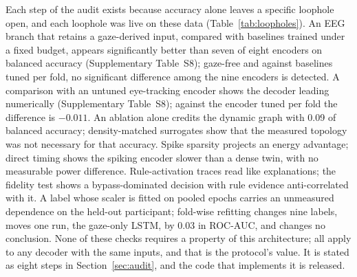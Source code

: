 Each step of the audit exists because accuracy alone leaves a specific loophole open, and each loophole was live on these data (Table~\ref{tab:loopholes}). An EEG branch that retains a gaze-derived input, compared with baselines trained under a fixed budget, appears significantly better than seven of eight encoders on balanced accuracy (Supplementary Table~S8); gaze-free and against baselines tuned per fold, no significant difference among the nine encoders is detected. A comparison with an untuned eye-tracking encoder shows the decoder leading numerically (Supplementary Table~S8); against the encoder tuned per fold the difference is $-0.011$. An ablation alone credits the dynamic graph with 0.09 of balanced accuracy; density-matched surrogates show that the measured topology was not necessary for that accuracy. Spike sparsity projects an energy advantage; direct timing shows the spiking encoder slower than a dense twin, with no measurable power difference. Rule-activation traces read like explanations; the fidelity test shows a bypass-dominated decision with rule evidence anti-correlated with it. A label whose scaler is fitted on pooled epochs carries an unmeasured dependence on the held-out participant; fold-wise refitting changes nine labels, moves one run, the gaze-only LSTM, by 0.03 in ROC-AUC, and changes no conclusion. None of these checks requires a property of this architecture; all apply to any decoder with the same inputs, and that is the protocol's value. It is stated as eight steps in Section~\ref{sec:audit}, and the code that implements it is released.

